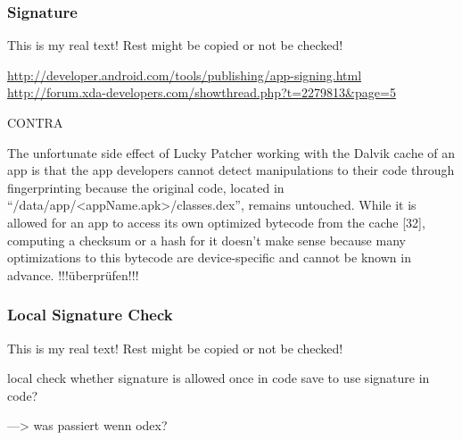 \subsubsection{Signature} \label{subsection:counter-improve-tampering-signature}

This is my real text! Rest might be copied or not be checked!


\url{http://developer.android.com/tools/publishing/app-signing.html}\newline
\url{http://forum.xda-developers.com/showthread.php?t=2279813&page=5}\newline

CONTRA\newline


The unfortunate side effect of Lucky Patcher working with the Dalvik cache of an app is that the app developers cannot detect manipulations to their code through fingerprinting because the original code, located in “/data/app/<appName.apk>/classes.dex”, remains untouched. While it is allowed for an app to access its own optimized bytecode from the cache [32], computing a checksum or a hash for it doesn’t make sense because many optimizations to this bytecode are device-specific and cannot be known in advance.
\cite{munteanLicense}
!!!überprüfen!!!


\subsubsection{Local Signature Check} \label{subsection:counter-tampering-signature-local}
This is my real text! Rest might be copied or not be checked!



local check whether signature is allowed\newline
once in code \newline
save to use signature in code?\newline



---> was passiert wenn odex?
